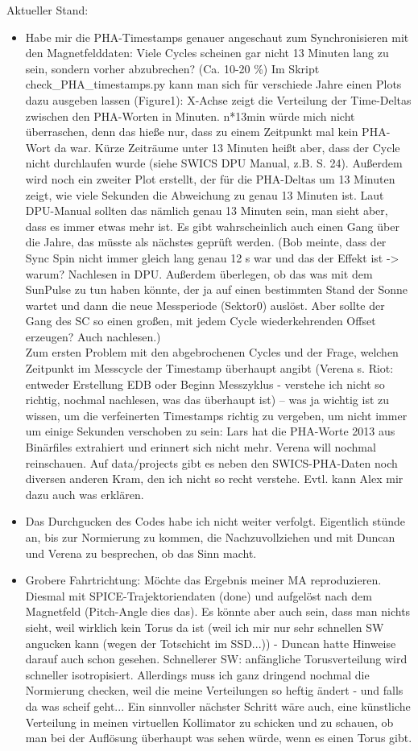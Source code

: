 \documentclass{tufte-book}
\newcommand{\newdaytt}[2]{\vspace{2cm}\marginnote{{\Large \textbf{\shortdayofweekname{#1}{#2}{2022}, ~\formatdate{#1}{#2}{2022}}}}}
\begin{document}
\newdaytt{18}{03}
Aktueller Stand:
\begin{itemize}
	\item Habe mir die PHA-Timestamps genauer angeschaut zum Synchronisieren mit den Magnetfelddaten: Viele Cycles scheinen gar nicht 13 Minuten lang zu sein, sondern vorher abzubrechen? (Ca. 10-20 \%) Im Skript check\_PHA\_timestamps.py kann man sich für verschiede Jahre einen Plots dazu ausgeben lassen (Figure1): X-Achse zeigt die Verteilung der Time-Deltas zwischen den PHA-Worten in Minuten. n*13min würde mich nicht überraschen, denn das hieße nur, dass zu einem Zeitpunkt mal kein PHA-Wort da war. Kürze Zeiträume unter 13 Minuten heißt aber, dass der Cycle nicht durchlaufen wurde (siehe SWICS DPU Manual, z.B. S. 24). Außerdem wird noch ein zweiter Plot erstellt, der für die PHA-Deltas um 13 Minuten zeigt, wie viele Sekunden die Abweichung zu genau 13 Minuten ist. Laut DPU-Manual sollten das nämlich genau 13 Minuten sein, man sieht aber, dass es immer etwas mehr ist. Es gibt wahrscheinlich auch einen Gang über die Jahre, das müsste als nächstes geprüft werden. (Bob meinte, dass der Sync Spin nicht immer gleich lang genau 12 s war und das der Effekt ist -> warum? Nachlesen in DPU. Außerdem überlegen, ob das was mit dem SunPulse zu tun haben könnte, der ja auf einen bestimmten Stand der Sonne wartet und dann die neue Messperiode (Sektor0) auslöst. Aber sollte der Gang des SC so einen großen, mit jedem Cycle wiederkehrenden Offset erzeugen? Auch nachlesen.)\\
	Zum ersten Problem mit den abgebrochenen Cycles und der Frage, welchen Zeitpunkt im Messcycle der Timestamp überhaupt angibt (Verena s. Riot: entweder Erstellung EDB oder Beginn Messzyklus - verstehe ich nicht so richtig, nochmal nachlesen, was das überhaupt ist) -- was ja wichtig ist zu wissen, um die verfeinerten Timestamps richtig zu vergeben, um nicht immer um einige Sekunden verschoben zu sein: Lars hat die PHA-Worte 2013 aus Binärfiles extrahiert und erinnert sich nicht mehr. Verena will nochmal reinschauen. Auf data/projects gibt es neben den SWICS-PHA-Daten noch diversen anderen Kram, den ich nicht so recht verstehe. Evtl. kann Alex mir dazu auch was erklären.
	\item Das Durchgucken des Codes habe ich nicht weiter verfolgt. Eigentlich stünde an, bis zur Normierung zu kommen, die Nachzuvollziehen und mit Duncan und Verena zu besprechen, ob das Sinn macht.
	\item Grobere Fahrtrichtung: Möchte das Ergebnis meiner MA reproduzieren. Diesmal mit SPICE-Trajektoriendaten (done) und aufgelöst nach dem Magnetfeld (Pitch-Angle dies das). Es könnte aber auch sein, dass man nichts sieht, weil wirklich kein Torus da ist (weil ich mir nur sehr schnellen SW angucken kann (wegen der Totschicht im SSD...)) - Duncan hatte Hinweise darauf auch schon gesehen. Schnellerer SW: anfängliche Torusverteilung wird schneller isotropisiert. Allerdings muss ich ganz dringend nochmal die Normierung checken, weil die meine Verteilungen so heftig ändert - und falls da was scheif geht... Ein sinnvoller nächster Schritt wäre auch, eine künstliche Verteilung in meinen virtuellen Kollimator zu schicken und zu schauen, ob man bei der Auflösung überhaupt was sehen würde, wenn es einen Torus gibt.

\end{itemize}
\end{document}
